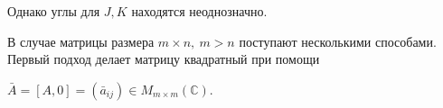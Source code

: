 Однако углы для $J, K$ находятся неоднозначно.

В случае матрицы размера $m \times n, \ m>n$ поступают несколькими способами.
Первый подход делает матрицу квадратный при помощи
\begin{center}
    $\bar{A} = [A,0] =(\bar{a}_{ij})\in M_{m\times m}(\mathbb{C})$.
\end{center}

